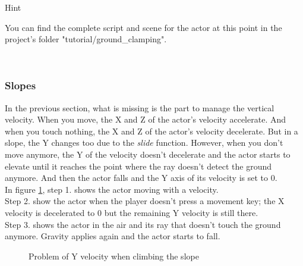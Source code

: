 \documentclass[10pt,a4paper]{article}
\newenvironment{hint}{%
\begin{bclogo}[logo=\bcinfo, couleurBarre=Green, noborder=true, 
               couleur=white]{Hint}
}{%
\end{bclogo}\hspace{1px}\\
}
\begin{document}
\begin{hint}
You can find the complete script and scene for the actor at this point in the project's folder "tutorial/ground\_clamping".
\end{hint}

\subsubsection{Slopes}
\label{subsec:slopes}
In the previous section, what is missing is the part to manage the vertical velocity. When you move, the X and Z of the actor's velocity accelerate. And when you touch nothing, the X and Z of the actor's velocity decelerate. But in a slope, the Y changes too due to the \textit{slide} function. However, when you don't move anymore, the Y of the velocity doesn't decelerate and the actor starts to elevate until it reaches the point where the ray doesn't detect the ground anymore. And then the actor falls and the Y axis of its velocity is set to 0.\\
In figure \ref{fig:problem_climb_slope}, step 1. shows the actor moving with a velocity. \\
Step 2. show the actor when the player doesn't press a movement key; the X velocity is decelerated to 0 but the remaining Y velocity is still there. \\
Step 3. shows the actor in the air and its ray that doesn't touch the ground anymore. Gravity applies again and the actor starts to fall.

\begin{figure}[H]
\centering
{}
\caption{Problem of Y velocity when climbing the slope}
\label{fig:problem_climb_slope}
\end{figure}
\end{document}
